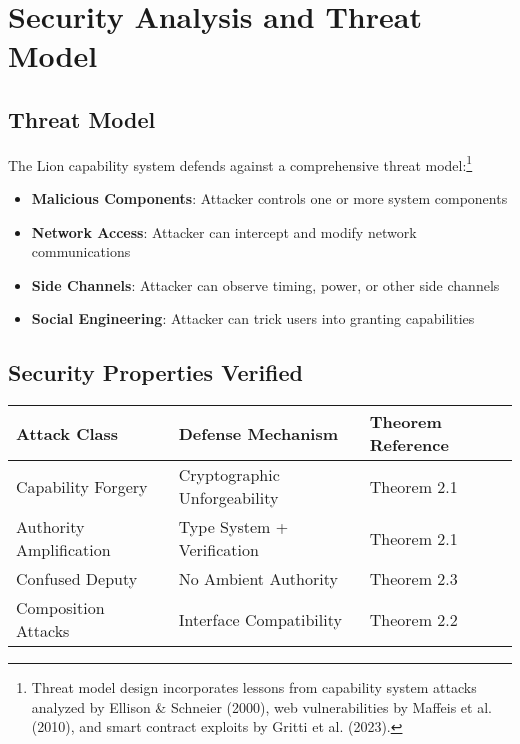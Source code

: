 \newpage

\section{Security Analysis and Threat Model}

\subsection{Threat Model}

The Lion capability system defends against a comprehensive threat model:\footnote{Threat model design incorporates lessons from capability system attacks analyzed by Ellison \& Schneier (2000), web vulnerabilities by Maffeis et al. (2010), and smart contract exploits by Gritti et al. (2023).}

\begin{itemize}
\item \textbf{Malicious Components}: Attacker controls one or more system components
\item \textbf{Network Access}: Attacker can intercept and modify network communications
\item \textbf{Side Channels}: Attacker can observe timing, power, or other side channels
\item \textbf{Social Engineering}: Attacker can trick users into granting capabilities
\end{itemize}

\subsection{Security Properties Verified}

\vspace{0.3cm}

\begin{center}
\begin{tabular}{@{}lll@{}}
\toprule
Attack Class & Defense Mechanism & Theorem Reference \\
\midrule
Capability Forgery & Cryptographic Unforgeability & Theorem 2.1 \\
Authority Amplification & Type System + Verification & Theorem 2.1 \\
Confused Deputy & No Ambient Authority & Theorem 2.3 \\
Composition Attacks & Interface Compatibility & Theorem 2.2 \\
\bottomrule
\end{tabular}
\end{center}

